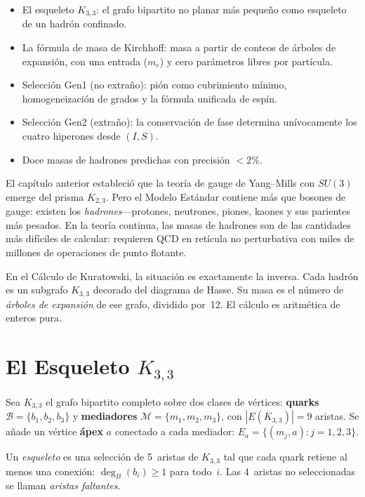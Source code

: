 \documentclass[11pt, a4paper, openany]{book}
\newenvironment{introduction}[1][Sinopsis del M\'odulo]{%
  \begin{tcolorbox}[
    enhanced,colback=structure!5,colframe=structure,
    colbacktitle=structure,coltitle=white,
    fonttitle=\small\bfseries,title={#1},
    arc=2pt,boxrule=0.7pt,
    left=8pt,right=8pt,top=6pt,bottom=6pt,
    before skip=12pt,after skip=12pt
  ]\itshape\begin{itemize}[leftmargin=*,itemsep=2pt,parsep=0pt]
}{%
  \end{itemize}\end{tcolorbox}
}
\begin{document}
\begin{introduction}
  \item El esqueleto $K_{3,3}$: el grafo bipartito no planar m\'as
        peque\~no como esqueleto de un hadr\'on confinado.
  \item La f\'ormula de masa de Kirchhoff: masa a partir de conteos de
        \'arboles de expansi\'on, con una entrada ($m_e$) y cero
        par\'ametros libres por part\'icula.
  \item Selecci\'on Gen1 (no extra\~no): pi\'on como cubrimiento
        m\'inimo, homogeneizaci\'on de grados y la f\'ormula unificada
        de esp\'in.
  \item Selecci\'on Gen2 (extra\~no): la conservaci\'on de fase
        determina un\'ivocamente los cuatro hiperones desde $(I, S)$.
  \item Doce masas de hadrones predichas con precisi\'on $< 2\%$.
\end{introduction}

El cap\'itulo anterior estableci\'o que la teor\'ia de gauge de
Yang--Mills con $SU(3)$ emerge del prisma $K_{2,3}$.  Pero el
Modelo Est\'andar contiene m\'as que bosones de gauge: existen los
\emph{hadrones}---protones, neutrones, piones, kaones y sus
parientes m\'as pesados.  En la teor\'ia continua, las masas de
hadrones son de las cantidades m\'as dif\'iciles de calcular:
requieren QCD en ret\'icula no perturbativa con miles de millones de
operaciones de punto flotante.

En el C\'alculo de Kuratowski, la situaci\'on es exactamente la
inversa.  Cada hadr\'on es un subgrafo $K_{3,3}$ decorado del
diagrama de Hasse.  Su masa es el n\'umero de \emph{\'arboles de
expansi\'on} de ese grafo, dividido por~12.  El c\'alculo es
aritm\'etica de enteros pura.

\section{El Esqueleto $K_{3,3}$}
\label{sec:hadron-backbone}

\begin{definition}
\label{def:kuratowski-backbone}
Sea $K_{3,3}$ el grafo bipartito completo sobre dos clases de
v\'ertices: \textbf{quarks} $\mathcal{B} = \{b_1, b_2, b_3\}$ y
\textbf{mediadores} $\mathcal{M} = \{m_1, m_2, m_3\}$, con
$|E(K_{3,3})| = 9$ aristas.  Se a\~nade un v\'ertice \textbf{\'apex}
$a$ conectado a cada mediador:
$E_a = \{(m_j, a) : j = 1, 2, 3\}$.

Un \emph{esqueleto} es una selecci\'on de 5~aristas de $K_{3,3}$ tal
que cada quark retiene al menos una conexi\'on:
$\deg_B(b_i) \geq 1$ para todo~$i$.  Las 4~aristas no seleccionadas
se llaman \emph{aristas faltantes}.
\end{definition}
\end{document}
